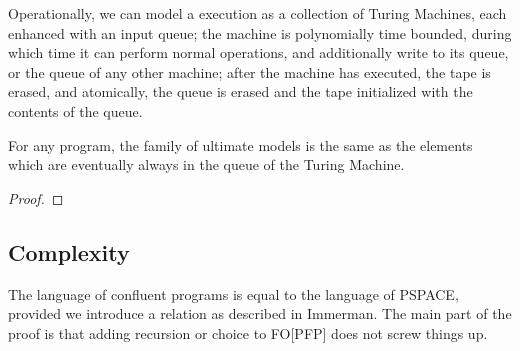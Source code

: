 Operationally, we can model a \lang execution as a collection of Turing Machines, each enhanced with an input queue; the machine is polynomially time bounded, during which time it can perform normal operations, and additionally write to its queue, or the queue of any other machine; after the machine has executed, the tape is erased, and atomically, the queue is erased and the tape initialized with the contents of the queue. 

\begin{lemma}
For any \lang program, the family of ultimate models is the same as the elements which are eventually always in the queue of the Turing Machine. 
\end{lemma}
\begin{proof}
\end{proof}


\subsection{Complexity}

The language of confluent \lang programs is equal to the language of PSPACE, provided we introduce a  relation as described in Immerman.  The main part of the proof is that adding recursion or choice to FO[PFP] does not screw things up.  
